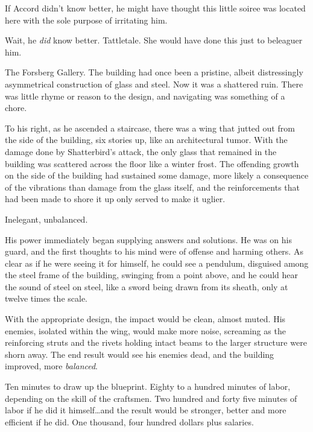 





If Accord didn't know better, he might have thought this little soiree was located here with the sole purpose of irritating him.



Wait, he \emph{did} know better.  Tattletale.  She would have done this just to beleaguer him.



The Forsberg Gallery.  The building had once been a pristine, albeit distressingly asymmetrical construction of glass and steel.  Now it was a shattered ruin.  There was little rhyme or reason to the design, and navigating was something of a chore.



To his right, as he ascended a staircase, there was a wing that jutted out from the side of the building, six stories up, like an architectural tumor.  With the damage done by Shatterbird's attack, the only glass that remained in the building was scattered across the floor like a winter frost.  The offending growth on the side of the building had sustained some damage, more likely a consequence of the vibrations than damage from the glass itself, and the reinforcements that had been made to shore it up only served to make it uglier.



Inelegant, unbalanced.



His power immediately began supplying answers and solutions.  He was on his guard, and the first thoughts to his mind were of offense and harming others.  As clear as if he were seeing it for himself, he could see a pendulum, disguised among the steel frame of the building, swinging from a point above, and he could hear the sound of steel on steel, like a sword being drawn from its sheath, only at twelve times the scale.



With the appropriate design, the impact would be clean, almost muted.  His enemies, isolated within the wing, would make more noise, screaming as the reinforcing struts and the rivets holding intact beams to the larger structure were shorn away.  The end result would see his enemies dead, and the building improved, more \emph{balanced}.



Ten minutes to draw up the blueprint.  Eighty to a hundred minutes of labor, depending on the skill of the craftsmen.  Two hundred and forty five minutes of labor if he did it himself\ldots and the result would be stronger, better and more efficient if he did.  One thousand, four hundred dollars plus salaries.



